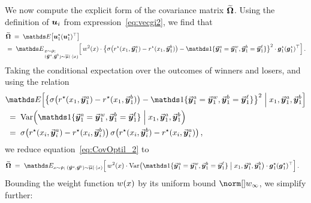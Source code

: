 	We now compute the explicit form of the covariance matrix $\widetilde{\boldsymbol{\Omega}}$. Using the definition of $\boldsymbol{u}_{i}$ from expression~\eqref{eq:vecgi2}, we find that
	\begin{align}
		& \CovOptil \; = \; \Exp\big[ \vecgstari{1} (\vecgstari{1})^{\top} \big] \notag  \\
		& = \; \Exp_{\, \begin{subarray}{l} ~ \\ \prompt \sim \promptdistr; \\ (\responseone, \responsetwo) \sim \responsedistravg(\cdot \mid \prompt)\end{subarray}} \Big[ \, \weight^2(\prompt) \cdot \big\{ \sigmoid \big( \rewardstar(\prompti{1}, \responseonei{1}) - \rewardstar(\prompti{1}, \responsetwoi{1}) \big) - \indicator\{ \responseonei{1} = \responsewini{1}, \responsetwoi{1} = \responselosei{1} \} \big\}^2 \cdot \gradstari{1} (\gradstari{1})^{\top} \Big] \, .
		\label{eq:CovOptil_2}
	\end{align}
	Taking the conditional expectation over the outcomes of winners and losers, and using the relation
	\begin{align*}
		&  \Exp\Big[
		\big\{ \sigmoid \big( \rewardstar(\prompti{1}, \responseonei{1}) - \rewardstar(\prompti{1}, \responsetwoi{1}) \big) - \indicator\{ \responseonei{1} = \responsewini{1}, \responsetwoi{1} = \responselosei{1} \} \big\}^2 \Bigm| \prompti{1}, \responseonei{1}, \responsetwoi{1} \Big]  \\
		& \; = \; \Var \Big( \indicator\{ \responseonei{1} = \responsewini{1}, \responsetwoi{1} = \responselosei{1} \} \Bigm|  \prompti{1}, \responseonei{1}, \responsetwoi{1} \Big)  \\
		& \; = \; \sigmoid \big( \rewardstar(\prompti{i}, \responseonei{i}) - \rewardstar(\prompti{i}, \responsetwoi{i}) \big) \, \sigmoid \big( \rewardstar(\prompti{i}, \responsetwoi{i}) - \rewardstar(\prompti{i}, \responseonei{i}) \big) \, ,
	\end{align*}
	we reduce equation~\eqref{eq:CovOptil_2} to
	\begin{align*}
		\CovOptil
		& \; = \; \Exp_{\prompt \sim \promptdistr; \; (\responseone, \responsetwo) \sim \responsedistravg(\cdot \mid \prompt)} \Big[ \, \weight^2(\prompt) \cdot \Var \big( \indicator\{ \responseonei{1} = \responsewini{1}, \responsetwoi{1} = \responselosei{1} \} \bigm|  \prompti{1}, \responseonei{1}, \responsetwoi{1} \big) \cdot \gradstari{1} (\gradstari{1})^{\top} \Big] \, .
	\end{align*}
	Bounding the weight function $w(x)$ by its uniform bound $\supnorm{\weight}$, we simplify further:
